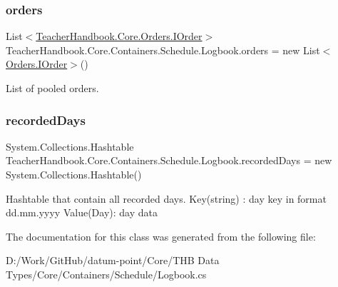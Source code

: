 \subsubsection{\texorpdfstring{orders}{orders}}
{\footnotesize\ttfamily List$<$\mbox{\hyperlink{interface_teacher_handbook_1_1_core_1_1_orders_1_1_i_order}{Teacher\+Handbook.\+Core.\+Orders.\+I\+Order}}$>$ Teacher\+Handbook.\+Core.\+Containers.\+Schedule.\+Logbook.\+orders = new List$<$\mbox{\hyperlink{interface_teacher_handbook_1_1_core_1_1_orders_1_1_i_order}{Orders.\+I\+Order}}$>$()\hspace{0.3cm}{\ttfamily [protected]}}



List of pooled orders. 

\mbox{\label{class_teacher_handbook_1_1_core_1_1_containers_1_1_schedule_1_1_logbook_ac848ae0c5ec991bae660417d0b96a13c}} 
\subsubsection{\texorpdfstring{recorded\+Days}{recordedDays}}
{\footnotesize\ttfamily System.\+Collections.\+Hashtable Teacher\+Handbook.\+Core.\+Containers.\+Schedule.\+Logbook.\+recorded\+Days = new System.\+Collections.\+Hashtable()\hspace{0.3cm}{\ttfamily [protected]}}



Hashtable that contain all recorded days. Key(string) \+: day key in format dd.\+mm.\+yyyy Value(\+Day)\+: day data 



The documentation for this class was generated from the following file\+:\begin{DoxyCompactItemize}
\item 
D\+:/\+Work/\+Git\+Hub/datum-\/point/\+Core/\+T\+H\+B Data Types/\+Core/\+Containers/\+Schedule/Logbook.\+cs\end{DoxyCompactItemize}
